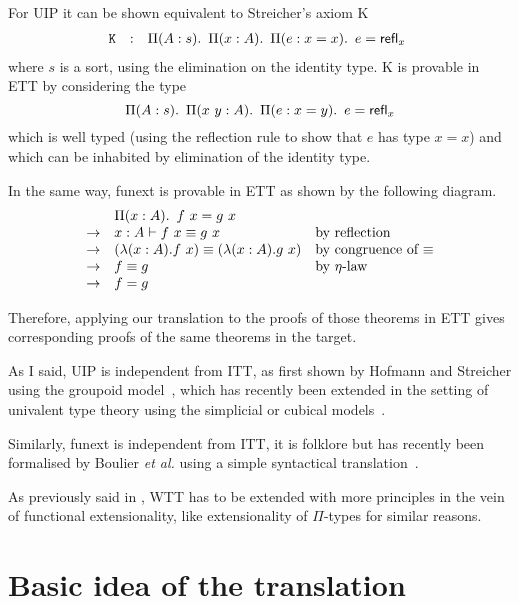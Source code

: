 For \acrshort{UIP} it can be shown equivalent to Streicher's axiom K
\[
\begin{array}{rcl}
  \mathtt{K} & : & \mathop{\Pi(A: s).\ } \mathop{\Pi(x :A).\ } \mathop{\Pi(e : x = x).\ } e = {\mathsf{refl}}_{x}\  \\
\end{array}
\]
where \(s\) is a sort, using the elimination on the identity type.
K is provable in \acrshort{ETT} by considering the type
\[
  \mathop{\Pi(A: s).\ } \mathop{\Pi(x \ y:A).\ } \mathop{\Pi(e : x = y).\ } e = {\mathsf{refl}}_{x}\  \\
\]
which is well typed (using the reflection rule to show that $e$ has
type $x= x$) and which can be inhabited by elimination of the identity
type.

In the same way, \acrshort{funext} is provable in \acrshort{ETT} as shown by the
following diagram.
\[
\begin{array}{cll}
  &\mathop{\Pi(x : A).\ } f\ x = g\ x \\
  \to & x : A \vdash f\ x \equiv g\ x &
  \mbox{by reflection} \\
  \to &  (\lambda (x:A). {f \ x}) \equiv (\lambda{(x:A)}.{g \ x}) &
  \mbox{by congruence of $\equiv$} \\
  \to &  f \equiv g & \mbox{by $\eta$-law} \\
  \to &  f = g
\end{array}
\]

Therefore, applying our translation to the proofs of those theorems in
\acrshort{ETT} gives corresponding proofs of the same theorems in the target.

As I said, \acrshort{UIP} is independent from \acrshort{ITT}, as first shown by
Hofmann and Streicher using the groupoid model~, which
has recently been extended in the setting of univalent type theory using the
simplicial or cubical models~.

Similarly, \acrshort{funext} is independent from \acrshort{ITT}, it is folklore
but has recently been formalised by Boulier \emph{et al.} using a simple
syntactical translation~.

As previously said in , \acrshort{WTT} has to be extended with
more principles in the vein of functional extensionality, like extensionality
of \(\Pi\)-types for similar reasons.

\section{Basic idea of the translation}


